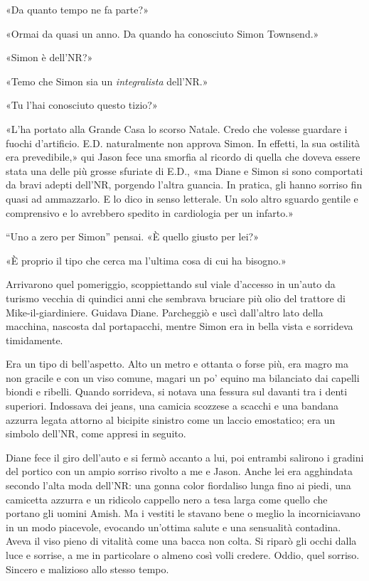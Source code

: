 «Da quanto tempo ne fa parte?»

«Ormai da quasi un anno. Da quando ha conosciuto Simon Townsend.»

«Simon è dell'NR?»

«Temo che Simon sia un \emph{integralista} dell'NR.»

«Tu l'hai conosciuto questo tizio?»

«L'ha portato alla Grande Casa lo scorso Natale. Credo che volesse
guardare i fuochi d'artificio. E.D. naturalmente non approva Simon. In
effetti, la sua ostilità era prevedibile,» qui Jason fece una smorfia al
ricordo di quella che doveva essere stata una delle più grosse sfuriate
di E.D., «ma Diane e Simon si sono comportati da bravi adepti dell'NR,
porgendo l'altra guancia. In pratica, gli hanno sorriso fin quasi ad
ammazzarlo. E lo dico in senso letterale. Un solo altro sguardo gentile
e comprensivo e lo avrebbero spedito in cardiologia per un infarto.»

``Uno a zero per Simon'' pensai. «È quello giusto per lei?»

«È proprio il tipo che cerca ma l'ultima cosa di cui ha bisogno.»

\separatorefiori

Arrivarono quel pomeriggio, scoppiettando sul viale d'accesso in un'auto
da turismo vecchia di quindici anni che sembrava bruciare più olio del
trattore di Mike-il-giardiniere. Guidava Diane. Parcheggiò e uscì
dall'altro lato della macchina, nascosta dal portapacchi, mentre Simon
era in bella vista e sorrideva timidamente.

Era un tipo di bell'aspetto. Alto un metro e ottanta o forse più, era
magro ma non gracile e con un viso comune, magari un po' equino ma
bilanciato dai capelli biondi e ribelli. Quando sorrideva, si notava una
fessura sul davanti tra i denti superiori. Indossava dei jeans, una
camicia scozzese a scacchi e una bandana azzurra legata attorno al
bicipite sinistro come un laccio emostatico; era un simbolo dell'NR,
come appresi in seguito.

Diane fece il giro dell'auto e si fermò accanto a lui, poi entrambi
salirono i gradini del portico con un ampio sorriso rivolto a me e
Jason. Anche lei era agghindata secondo l'alta moda dell'NR: una gonna
color fiordaliso lunga fino ai piedi, una camicetta azzurra e un
ridicolo cappello nero a tesa larga come quello che portano gli uomini
Amish. Ma i vestiti le stavano bene o meglio la incorniciavano in un
modo piacevole, evocando un'ottima salute e una sensualità contadina.
Aveva il viso pieno di vitalità come una bacca non colta. Si riparò gli
occhi dalla luce e sorrise, a me in particolare o almeno così volli
credere. Oddio, quel sorriso. Sincero e malizioso allo stesso tempo.

